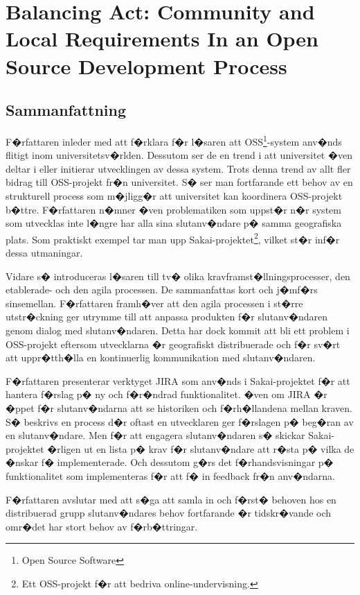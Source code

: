\documentclass[11pt, oneside]{article}   	%
\begin{document}
\newpage
\section{Balancing Act: Community and Local Requirements In an Open Source Development Process}
\subsection{Sammanfattning}
F�rfattaren inleder med att f�rklara f�r l�saren att OSS\footnote{Open Source Software}-system anv�nds flitigt inom universitetsv�rlden. Dessutom ser de en trend i att universitet �ven deltar i eller initierar utvecklingen av dessa system. Trots denna trend av allt fler bidrag till OSS-projekt fr�n universitet. S� ser man fortfarande ett behov av en strukturell process som m�jligg�r att universitet kan koordinera OSS-projekt b�ttre. F�rfattaren n�mner �ven problematiken som uppst�r n�r system som utvecklas inte l�ngre har alla sina slutanv�ndare p� samma geografiska plats. Som praktiskt exempel tar man upp Sakai-projektet\footnote{Ett OSS-projekt f�r att bedriva online-undervisning.}, vilket st�r inf�r dessa utmaningar.

Vidare s� introduceras l�saren till tv� olika kravframst�llningsprocesser, den etablerade- och den agila processen. De sammanfattas kort och j�mf�rs sinsemellan. F�rfattaren framh�ver att den agila processen i st�rre utstr�ckning ger utrymme till att anpassa produkten f�r slutanv�ndaren genom dialog med slutanv�ndaren. Detta har dock kommit att bli ett problem i OSS-projekt eftersom utvecklarna �r geografiskt distribuerade och f�r sv�rt att uppr�tth�lla en kontinuerlig kommunikation med slutanv�ndaren.

F�rfattaren presenterar verktyget JIRA som anv�nds i Sakai-projektet f�r att hantera f�rslag p� ny och f�r�ndrad funktionalitet. �ven om JIRA �r �ppet f�r slutanv�ndarna att se historiken och f�rh�llandena mellan kraven. S� beskrivs en process d�r oftast en utvecklaren ger f�rslagen p� beg�ran av en slutanv�ndare. Men f�r att engagera slutanv�ndaren s� skickar Sakai-projektet �rligen ut en lista p� krav f�r slutanv�ndare att r�sta p� vilka de �nskar f� implementerade. Och dessutom g�rs det f�rhandsvisningar p� funktionalitet som implementeras f�r att f� in feedback fr�n anv�ndarna.

F�rfattaren avslutar med att s�ga att samla in och f�rst� behoven hos en distribuerad grupp slutanv�ndares behov fortfarande �r tidskr�vande och omr�det har stort behov av f�rb�ttringar.
\end{document}
